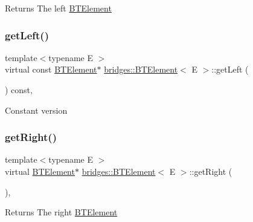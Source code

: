 \begin{DoxyReturn}{Returns}
The left \mbox{\hyperlink{classbridges_1_1_b_t_element}{B\+T\+Element}} 
\end{DoxyReturn}
\mbox{\label{classbridges_1_1_b_t_element_a01ebba851e9cc6ec77df16201604597a}} 
\subsubsection{\texorpdfstring{get\+Left()}{getLeft()}\hspace{0.1cm}{\footnotesize\ttfamily [2/2]}}
{\footnotesize\ttfamily template$<$typename E $>$ \\
virtual const \mbox{\hyperlink{classbridges_1_1_b_t_element}{B\+T\+Element}}$\ast$ \mbox{\hyperlink{classbridges_1_1_b_t_element}{bridges\+::\+B\+T\+Element}}$<$ E $>$\+::get\+Left (\begin{DoxyParamCaption}{ }\end{DoxyParamCaption}) const\hspace{0.3cm}{\ttfamily [inline]}, {\ttfamily [virtual]}}

Constant version \mbox{\label{classbridges_1_1_b_t_element_a931de8a71c04479a4aa0885ecee2a855}} 
\subsubsection{\texorpdfstring{get\+Right()}{getRight()}\hspace{0.1cm}{\footnotesize\ttfamily [1/2]}}
{\footnotesize\ttfamily template$<$typename E $>$ \\
virtual \mbox{\hyperlink{classbridges_1_1_b_t_element}{B\+T\+Element}}$\ast$ \mbox{\hyperlink{classbridges_1_1_b_t_element}{bridges\+::\+B\+T\+Element}}$<$ E $>$\+::get\+Right (\begin{DoxyParamCaption}{ }\end{DoxyParamCaption})\hspace{0.3cm}{\ttfamily [inline]}, {\ttfamily [virtual]}}

\begin{DoxyReturn}{Returns}
The right \mbox{\hyperlink{classbridges_1_1_b_t_element}{B\+T\+Element}} 
\end{DoxyReturn}
\mbox{\label{classbridges_1_1_b_t_element_ad3b12cd9fa6f3f18fb66c07dbc73a409}} 
